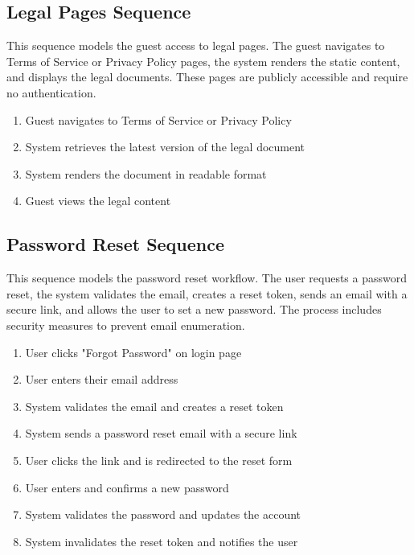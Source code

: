 \subsection{Legal Pages Sequence}
This sequence models the guest access to legal pages. The guest navigates to
Terms of Service or Privacy Policy pages, the system renders the static
content, and displays the legal documents. These pages are publicly accessible
and require no authentication.

\begin{enumerate}[topsep=0pt,itemsep=1pt,parsep=0pt,partopsep=0pt]
    \item Guest navigates to Terms of Service or Privacy Policy
    \item System retrieves the latest version of the legal document
    \item System renders the document in readable format
    \item Guest views the legal content
\end{enumerate}

%

\subsection{Password Reset Sequence}
This sequence models the password reset workflow. The user requests a password
reset, the system validates the email, creates a reset token, sends an email
with a secure link, and allows the user to set a new password. The process
includes security measures to prevent email enumeration.

\begin{enumerate}[topsep=0pt,itemsep=1pt,parsep=0pt,partopsep=0pt]
    \item User clicks "Forgot Password" on login page
    \item User enters their email address
    \item System validates the email and creates a reset token
    \item System sends a password reset email with a secure link
    \item User clicks the link and is redirected to the reset form
    \item User enters and confirms a new password
    \item System validates the password and updates the account
    \item System invalidates the reset token and notifies the user
\end{enumerate}

